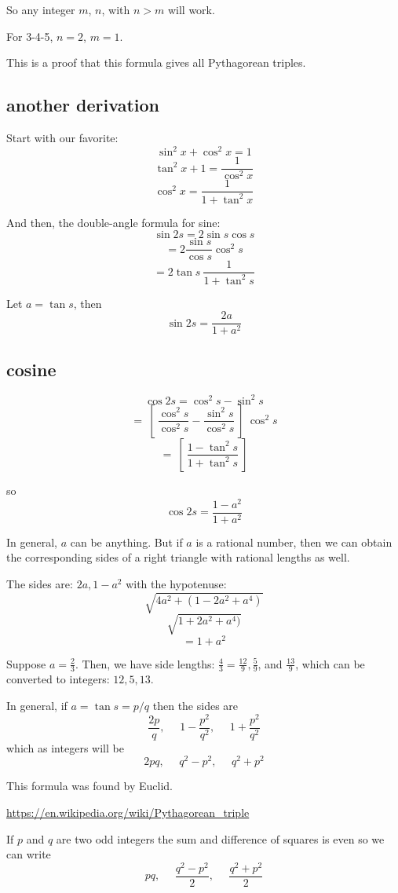 \documentclass[11pt, oneside]{article}
\begin{document}
So any integer $m$, $n$, with $n > m$ will work.

For 3-4-5, $n = 2$, $m=1$.

This is a proof that this formula gives all Pythagorean triples.

\subsection*{another derivation}

Start with our favorite:
\[ \sin^2 x + \cos^2 x = 1 \]
\[ \tan^2 x + 1 = \frac{1}{\cos^2 x} \]
\[ \cos^2 x = \frac{1}{1 + \tan^2 x} \]

And then, the double-angle formula for sine:
\[ \sin 2s = 2 \sin s \cos s \]
\[ = 2 \frac{\sin s}{\cos s} \cos^2 s \]
\[ = 2 \tan s \ \frac{1}{1 + \tan^2 s} \]

Let $a = \tan s$, then
\[ \sin 2s = \frac{2a}{1 + a^2} \]

\subsection*{cosine}

\[ \cos 2s = \cos^2 s - \sin^2 s \]
\[ = \ [ \ \frac{\cos^2 s}{\cos^2 s} - \frac{\sin^2 s}{\cos^2 s} \ ] \ \cos^2 s \]
\[ = \ [ \ \frac{1 - \tan^2 s}{1 + \tan^2 s} \ ] \]
 
so
\[ \cos 2s = \frac{1 - a^2}{1 + a^2} \]

In general, $a$ can be anything.  But if $a$ is a rational number, then we can obtain the corresponding sides of a right triangle with rational lengths as well.  

The sides are:  $2a, 1 - a^2$ with the hypotenuse:
\[ \sqrt{4a^2 + (1 - 2a^2 + a^4)} \]
\[ \sqrt{1 + 2a^2 + a^4)} \]
\[ = 1 + a^2 \]

Suppose $a = \frac{2}{3}$.  Then, we have side lengths:  $\frac{4}{3} = \frac{12}{9},\frac{5}{9}$, and $\frac{13}{9}$, which can be converted to integers:  $12, 5, 13$.

In general, if $a = \tan s = p/q$ then the sides are
\[ \frac{2p}{q}, \ \ \ \ \ \ 1 - \frac{p^2}{q^2}, \ \ \ \ \ \ 1 +\frac{p^2}{q^2} \]
which as integers will be
\[ 2pq, \ \ \ \ \ \ q^2 - p^2, \ \ \ \ \ \ q^2 + p^2 \]

This formula was found by Euclid.

\url{https://en.wikipedia.org/wiki/Pythagorean_triple}

If $p$ and $q$ are two odd integers the sum and difference of squares is even so we can write
\[ pq, \ \ \ \ \ \ \frac{q^2 - p^2}{2}, \ \ \ \ \ \ \frac{q^2 + p^2}{2} \]
\end{document}
